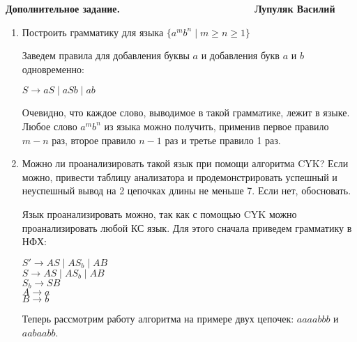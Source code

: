 \documentclass[12pt]{article}
\def\to{\rightarrow}
\def\b{\textbf}
\newenvironment{Problems}{
	\begin{enumerate}[]
	}{       
	\end{enumerate}
}
\begin{document}
	\b{Дополнительное задание.\ \ \ \ \ \ \ \ \ \ \ \ \ \ \ \ \ \ \ \ \ \ \ \  Лупуляк Василий}
	
	\begin{Problems}
		\item [\fbox{1.}] Построить грамматику для языка $\{a^mb^n \mid m \ge n \ge 1\}$
		
		Заведем правила для добавления буквы $a$ и добавления букв $a$ и $b$ одновременно:
		\begin{center}
			$S \to aS \mid aSb \mid ab$\\
		\end{center}
		Очевидно, что каждое слово, выводимое в такой грамматике, лежит в языке. Любое слово $a^mb^n$ из языка можно получить, применив первое правило $m - n$ раз, второе правило $n - 1$ раз и третье правило 1 раз.
  		
		\item [\fbox{2.}] Можно ли проанализировать такой язык при помощи алгоритма CYK? Если можно, привести таблицу анализатора и продемонстрировать успешный и неуспешный вывод на 2 цепочках
		длины не меньше 7. Если нет, обосновать.
		
		Язык проанализировать можно, так как с помощью CYK можно проанализировать любой КС язык. Для этого сначала приведем грамматику в НФХ:
		
		
		\begin{center}
			$S' \to AS \mid AS_b \mid AB$\\
			$S \to AS \mid AS_b \mid AB$\\
			$S_b \to SB$\\
			$A \to a$\\
			$B \to b$
		\end{center}
	
	Теперь рассмотрим работу алгоритма на примере двух цепочек: $aaaabbb$ и $aabaabb$. 
	

\end{Problems}
\end{document}
